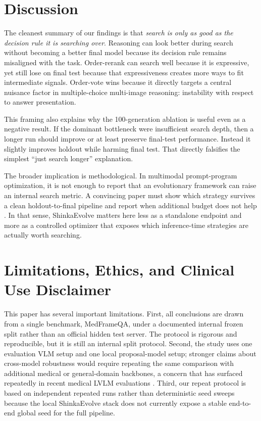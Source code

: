 \documentclass[11pt]{article}
\begin{document}
\section{Discussion}

The cleanest summary of our findings is that \emph{search is only as good as the decision rule it is searching over}. Reasoning can look better during search without becoming a better final model because its decision rule remains misaligned with the task. Order-rerank can search well because it is expressive, yet still lose on final test because that expressiveness creates more ways to fit intermediate signals. Order-vote wins because it directly targets a central nuisance factor in multiple-choice multi-image reasoning: instability with respect to answer presentation.

This framing also explains why the 100-generation ablation is useful even as a negative result. If the dominant bottleneck were insufficient search depth, then a longer run should improve or at least preserve final-test performance. Instead it slightly improves holdout while harming final test. That directly falsifies the simplest ``just search longer'' explanation.

The broader implication is methodological. In multimodal prompt-program optimization, it is not enough to report that an evolutionary framework can raise an internal search metric. A convincing paper must show which strategy survives a clean holdout-to-final pipeline and report when additional budget does not help \citep{jeong2024medicaladapt,agrawal2025evaluationillusion}. In that sense, ShinkaEvolve matters here less as a standalone endpoint and more as a controlled optimizer that exposes which inference-time strategies are actually worth searching.

\section{Limitations, Ethics, and Clinical Use Disclaimer}

This paper has several important limitations. First, all conclusions are drawn from a single benchmark, MedFrameQA, under a documented internal frozen split rather than an official hidden test server. The protocol is rigorous and reproducible, but it is still an internal split protocol. Second, the study uses one evaluation VLM setup and one local proposal-model setup; stronger claims about cross-model robustness would require repeating the same comparison with additional medical or general-domain backbones, a concern that has surfaced repeatedly in recent medical LVLM evaluations \citep{jeong2024medicaladapt,agrawal2025evaluationillusion}. Third, our repeat protocol is based on independent repeated runs rather than deterministic seed sweeps because the local ShinkaEvolve stack does not currently expose a stable end-to-end global seed for the full pipeline.
\end{document}
